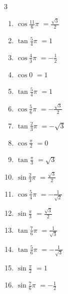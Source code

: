 \begin{multicols}{3}
\begin{enumerate}
  \item $\displaystyle \cos{\frac{11}{6}\pi}$
        $\displaystyle =\frac{\sqrt{3}}{2}$

  \item $\displaystyle \tan{\frac{5}{4}\pi}$
        $\displaystyle =1$

  \item $\displaystyle \cos{\frac{4}{3}\pi}$
        $\displaystyle =-\frac{1}{2}$

  \item $\displaystyle \cos{0}$
        $\displaystyle =1$

  \item $\displaystyle \tan{\frac{5}{4}\pi}$
        $\displaystyle =1$

  \item $\displaystyle \cos{\frac{5}{6}\pi}$
        $\displaystyle =-\frac{\sqrt{3}}{2}$

\columnbreak %

  \item $\displaystyle \tan{\frac{2}{3}\pi}$
        $\displaystyle =-\sqrt{3}$

  \item $\displaystyle \cos{\frac{\pi}{2}}$
        $\displaystyle =0$

  \item $\displaystyle \tan{\frac{\pi}{3}}$
        $\displaystyle =\sqrt{3}$

  \item $\displaystyle \sin{\frac{2}{3}\pi}$
        $\displaystyle =\frac{\sqrt{3}}{2}$

  \item $\displaystyle \cos{\frac{5}{4}\pi}$
        $\displaystyle =-\frac{1}{\sqrt{2}}$

  \item $\displaystyle \sin{\frac{\pi}{3}}$
        $\displaystyle =\frac{\sqrt{3}}{2}$

  \item $\displaystyle \tan{\frac{7}{6}\pi}$
        $\displaystyle =\frac{1}{\sqrt{3}}$

  \item $\displaystyle \tan{\frac{5}{6}\pi}$
        $\displaystyle =-\frac{1}{\sqrt{3}}$

  \item $\displaystyle \sin{\frac{\pi}{2}}$
        $\displaystyle =1$

  \item $\displaystyle \sin{\frac{7}{6}\pi}$
        $\displaystyle =-\frac{1}{2}$


\end{enumerate}
\end{multicols}
